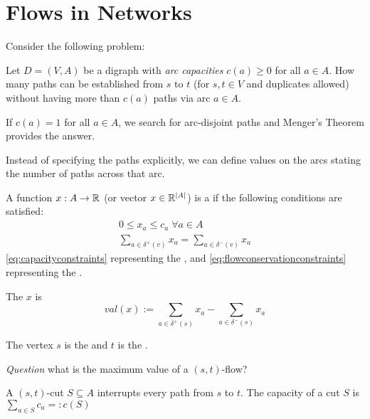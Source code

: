 \begin{lec}[2011-12-05]\end{lec}
\section*{Flows in Networks}

Consider the following problem:

Let $D=(V,A)$ be a digraph with \emph{arc capacities} $c(a) \geq 0$ for all $a \in A$. How many paths can be established from $s$ to $t$ (for $s, t \in V$ and duplicates allowed) without having more than $c(a)$ paths via arc $a \in A$.

If $c(a) = 1$ for all $a \in A$, we search for arc-disjoint paths and Menger's Theorem provides the answer.

Instead of specifying the paths explicitly,  we can define values on the arcs stating the number of paths across that arc.

\begin{defn}
	A function $x: A \rightarrow \mathbb{R}$ (or vector $x \in \mathbb{R}^{|A|}$) is a  if the following conditions are satisfied:
	\begin{align}
		\label{eq:capacityconstraints} 0 \leq x_a \leq c_a \; \forall a \in A\\
		\label{eq:flowconservationconstraints}\sum\limits_{a \in \delta^+(v)}x_a = \sum\limits_{a \in \delta^-(v)}x_a
	\end{align}
	\eqref{eq:capacityconstraints} representing the , and \eqref{eq:flowconservationconstraints} representing the .
	
	The  $x$ is 
	\[
		val(x):=\sum\limits_{a \in \delta^+(s)}x_a - \sum\limits_{a \in \delta^-(s)}x_a
	\]
	
	The vertex $s$ is the  and $t$ is the .
\end{defn} 

\emph{Question} what is the maximum value of a $(s,t)$-flow?

A $(s,t)$-cut $S \subseteq A$ interrupts every path from $s$ to $t$. The capacity of a cut $S$ is $\sum\limits_{a \in S} c_a =: c(S)$

